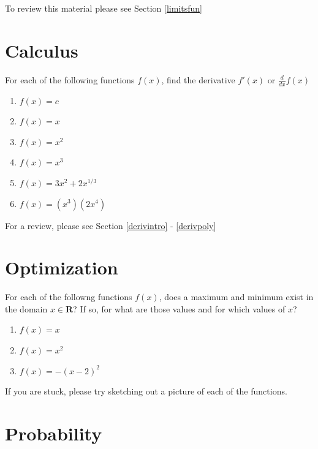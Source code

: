\documentclass[]{book}
\providecommand{\tightlist}{%
  \setlength{\itemsep}{0pt}\setlength{\parskip}{0pt}}
\theoremstyle{definition}
\theoremstyle{definition}
\theoremstyle{definition}
\theoremstyle{remark}
\begin{document}
To review this material please see Section \ref{limitsfun}

\section*{Calculus}\label{calculus}

For each of the following functions \(f(x)\), find the derivative
\(f'(x)\) or \(\frac{d}{dx}f(x)\)

\begin{enumerate}
\def\labelenumi{\arabic{enumi}.}
\tightlist
\item
  \(f(x)=c\)
\item
  \(f(x)=x\)
\item
  \(f(x)=x^2\)
\item
  \(f(x)=x^3\)
\item
  \(f(x)=3x^2+2x^{1/3}\)
\item
  \(f(x)=(x^3)(2x^4)\)
\end{enumerate}

For a review, please see Section \ref{derivintro} - \ref{derivpoly}

\section*{Optimization}\label{optimization}

For each of the followng functions \(f(x)\), does a maximum and minimum
exist in the domain \(x \in \mathbf{R}\)? If so, for what are those
values and for which values of \(x\)?

\begin{enumerate}
\def\labelenumi{\arabic{enumi}.}
\tightlist
\item
  \(f(x) = x\)
\item
  \(f(x) = x^2\)
\item
  \(f(x) = -(x - 2)^2\)
\end{enumerate}

If you are stuck, please try sketching out a picture of each of the
functions.

\section*{Probability}\label{probability}
\end{document}
